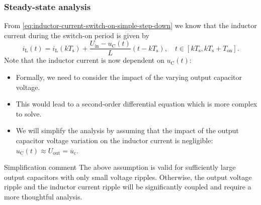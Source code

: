 \begin{frame}
    \frametitle{Steady-state analysis}
    From \eqref{eq:inductor-current-switch-on-simple-step-down} we know that the inductor current during the switch-on period is given by
    \begin{equation*}
        i_\mathrm{L}(t) = i_\mathrm{L}(k T_\mathrm{s}) + \frac{U_\mathrm{in}-u_\mathrm{C}(t)}{L} (t - k T_\mathrm{s}), \quad t\in [k T_\mathrm{s}, k T_\mathrm{s} + T_\mathrm{on}]. 
    \end{equation*}
   Note that the inductor current is now dependent on $u_\mathrm{C}(t)$:
    \begin{itemize}
        \item Formally, we need to consider the impact of the varying output capacitor voltage.
        \item This would lead to a second-order differential equation which is more complex to solve.
        \item We will simplify the analysis by assuming that the impact of the output capacitor voltage variation on the inductor current is negligible: $u_\mathrm{C}(t) \approx U_\mathrm{out}=\overline{u}_\mathrm{c}$.
    \end{itemize} 
    \vspace{-0.5cm}
    \begin{varblock}{Simplification comment}
        The above assumption is valid for sufficiently large output capacitors with only small voltage ripples. Otherwise, the output voltage ripple and the inductor current ripple will be significantly coupled and require a more thoughtful analysis.
    \end{varblock}
\end{frame}

